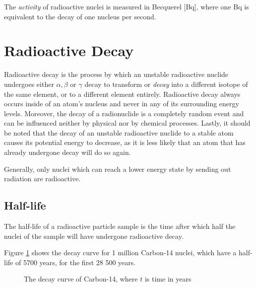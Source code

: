 The \emph{activity} of radioactive nuclei is measured in Becquerel [Bq], where one Bq is equivalent to the decay of one nucleus per second.

\pagebreak

\chapter*{Radioactive Decay}

Radioactive decay is the process by which an unstable radioactive nuclide undergoes either $\alpha, \beta$ or $\gamma$ decay to transform or \emph{decay} into a different isotope of the same element, or to a different element entirely. Radioactive decay always occurs inside of an atom's nucleus and never in any of its surrounding energy levels. Moreover, the decay of a radionuclide is a completely random event and can be influenced neither by physical nor by chemical processes. Lastly, it should be noted that the decay of an unstable radioactive nuclide to a stable atom causes its potential energy to decrease, as it is less likely that an atom that has already undergone decay will do so again.

Generally, only nuclei which can reach a lower energy state by sending out radiation are radioactive.

\section*{Half-life}

The half-life of a radioactive particle sample is the time after which half the nuclei of the sample will have undergone radioactive decay.

Figure \ref{fig:decay} shows the decay curve for 1 million Carbon-14 nuclei, which have a half-life of 5700 years, for the first 28 500 years.

\begin{figure}[h!]
\centering
\caption{The decay curve of Carbon-14, where $t$ is time in years}
\label{fig:decay}
\end{figure}

